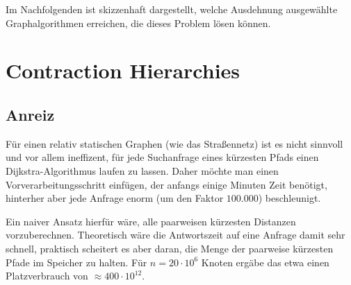 \documentclass{scrartcl}%
\begin{document}
    \vspace*{0.3cm}
    Im Nachfolgenden ist skizzenhaft dargestellt, welche Ausdehnung ausgewählte Graphalgorithmen erreichen, die dieses Problem lösen können.
    \begin{figure}[htb]
        \centering
    \end{figure}

    \section*{Contraction Hierarchies}\label{sec:contractionHierarchies}
    \subsection*{Anreiz}

    Für einen relativ statischen Graphen (wie das Straßennetz) ist es nicht sinnvoll und vor allem ineffizent,
    für jede Suchanfrage eines kürzesten Pfads einen Dijkstra-Algorithmus laufen zu lassen.
    Daher möchte man einen Vorverarbeitungsschritt einfügen, der anfangs einige Minuten Zeit benötigt,
    hinterher aber jede Anfrage enorm (um den Faktor $100.000$) beschleunigt.

    Ein naiver Ansatz hierfür wäre, alle paarweisen kürzesten Distanzen vorzuberechnen.
    Theoretisch wäre die Antwortszeit auf eine Anfrage damit sehr schnell, praktisch scheitert es aber daran,
    die Menge der paarweise kürzesten Pfade im Speicher zu halten.
    Für $n=20 \cdot 10^6$ Knoten ergäbe das etwa einen Platzverbrauch von $\approx 400 \cdot 10^{12}$.
\end{document}
